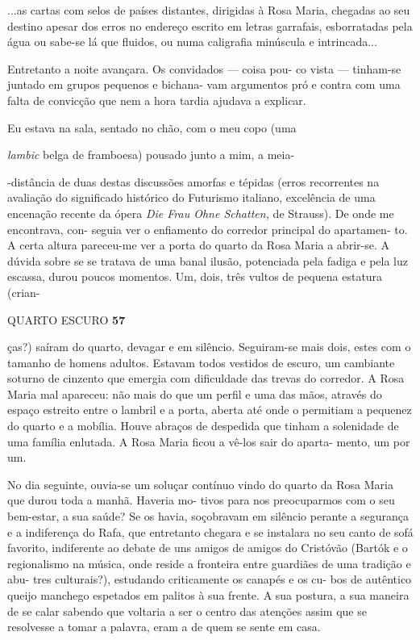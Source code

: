 ...as cartas com selos de países distantes, dirigidas à Rosa Maria,
chegadas ao seu destino apesar dos erros no endereço escrito em letras
garrafais, esborratadas pela água ou sabe-se lá que fluidos, ou numa
caligrafia minúscula e intrincada...

Entretanto a noite avançara. Os convidados --- coisa pou- co vista ---
tinham-se juntado em grupos pequenos e bichana- vam argumentos pró e
contra com uma falta de convicção que nem a hora tardia ajudava a
explicar.

Eu estava na sala, sentado no chão, com o meu copo (uma

\emph{lambic }belga de framboesa) pousado junto a mim, a meia-

-distância de duas destas discussões amorfas e tépidas (erros
recorrentes na avaliação do significado histórico do Futurismo italiano,
excelência de uma encenação recente da ópera \emph{Die Frau Ohne
Schatten, }de Strauss). De onde me encontrava, con- seguia ver o
enfiamento do corredor principal do apartamen- to. A certa altura
pareceu-me ver a porta do quarto da Rosa Maria a abrir-se. A dúvida
sobre se se tratava de uma banal ilusão, potenciada pela fadiga e pela
luz escassa, durou poucos momentos. Um, dois, três vultos de pequena
estatura (crian-

QUARTO ESCURO \textbf{57}

ças?) saíram do quarto, devagar e em silêncio. Seguiram-se mais dois,
estes com o tamanho de homens adultos. Estavam todos vestidos de escuro,
um cambiante soturno de cinzento que emergia com dificuldade das trevas
do corredor. A Rosa Maria mal apareceu: não mais do que um perfil e uma
das mãos, através do espaço estreito entre o lambril e a porta, aberta
até onde o permitiam a pequenez do quarto e a mobília. Houve abraços de
despedida que tinham a solenidade de uma família enlutada. A Rosa Maria
ficou a vê-los sair do aparta- mento, um por um.

No dia seguinte, ouvia-se um soluçar contínuo vindo do quarto da Rosa
Maria que durou toda a manhã. Haveria mo- tivos para nos preocuparmos
com o seu bem-estar, a sua saúde? Se os havia, soçobravam em silêncio
perante a segurança e a indiferença do Rafa, que entretanto chegara e se
instalara no seu canto de sofá favorito, indiferente ao debate de uns
amigos de amigos do Cristóvão (Bartók e o regionalismo na música, onde
reside a fronteira entre guardiães de uma tradição e abu- tres
culturais?), estudando criticamente os canapés e os cu- bos de autêntico
queijo manchego espetados em palitos à sua frente. A sua postura, a sua
maneira de se calar sabendo que voltaria a ser o centro das atenções
assim que se resolvesse a tomar a palavra, eram a de quem se sente em
casa.

